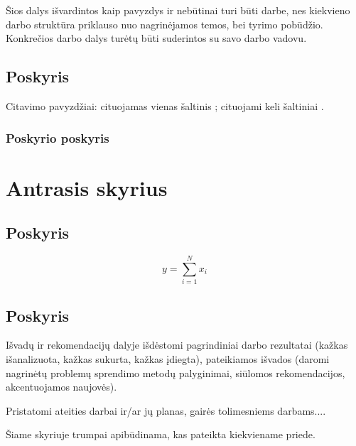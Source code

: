 \documentclass[fleqn]{VUMIFKompMagistrinis}
\begin{document}
Šios dalys išvardintos kaip pavyzdys ir nebūtinai turi būti darbe, nes
kiekvieno darbo struktūra priklauso nuo nagrinėjamos temos, bei tyrimo
pobūdžio. Konkrečios darbo dalys turėtų būti suderintos su savo darbo vadovu.

\subsection{Poskyris}
Citavimo pavyzdžiai: cituojamas vienas šaltinis \cite{PvzStraipsnLt}; cituojami
keli šaltiniai \cite{PvzStraipsnEn, PvzKonfLt, PvzKonfEn, PvzKnygLt, PvzKnygEn,
PvzElPubLt, PvzElPubEn, PvzMagistrLt, PvzPhdEn}.

\subsubsection{Poskyrio poskyris}
\section{Antrasis skyrius}
\subsection{Poskyris}
\begin{equation}\label{eq:pavyzdys}
    y = \sum_{i=1}^N x_i
\end{equation}

\subsection{Poskyris}

Išvadų ir rekomendacijų dalyje išdėstomi pagrindiniai darbo rezultatai (kažkas
išanalizuota, kažkas sukurta, kažkas įdiegta), pateikiamos išvados (daromi
nagrinėtų problemų sprendimo metodų palyginimai, siūlomos rekomendacijos,
akcentuojamos naujovės).

Pristatomi ateities darbai ir/ar jų planas, gairės tolimesniems darbams....

\printbibliography[heading=bibintoc]  %

Šiame skyriuje trumpai apibūdinama, kas pateikta kiekviename priede.
\end{document}
